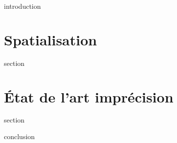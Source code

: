 
\chaptertoc{}

\label{sec:3-int}
{introduction}

\section{Spatialisation}
\label{sec:3-1}
{section}

\section{État de l'art imprécision}
\label{sec:3-2}
{section}


\label{sec:3-cnc}
{conclusion}

